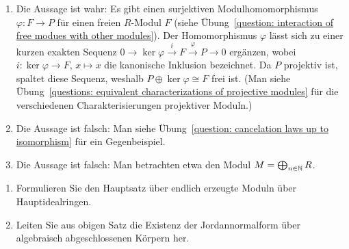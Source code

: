\begin{solution}
\begin{enumerate}
    \item
      Die Aussage ist wahr:
      Es gibt einen surjektiven Modulhomomorphismus $\varphi \colon F \to P$ für einen freien $R$-Modul $F$ (siehe Übung~\ref{question: interaction of free modues with other modules}).
      Der Homomorphismus $\varphi$ lässt sich zu einer kurzen exakten Sequenz $0 \to \ker \varphi \xrightarrow{i} F \xrightarrow{\varphi} P \to 0$ ergänzen, wobei $i \colon \ker \varphi \to F$, $x \mapsto x$ die kanonische Inklusion bezeichnet.
      Da $P$ projektiv ist, spaltet diese Sequenz, weshalb $P \oplus \ker \varphi \cong F$ frei ist.
      (Man siehe Übung~\ref{questions: equivalent characterizations of projective modules} für die verschiedenen Charakterisierungen projektiver Moduln.)
      
    \item
      Die Aussage ist falsch:
      Man siehe Übung~\ref{question: cancelation laws up to isomorphism} für ein Gegenbeispiel.
      
    \item
      Die Aussage ist falsch:
      Man betrachten etwa den Modul $M = \bigoplus_{n \in \mathbb{N}} R$.
  \end{enumerate}
\end{solution}


\begin{question}[subtitle = Herleitung der Jordannormalform]
  \begin{enumerate}
    \item
      Formulieren Sie den Hauptsatz über endlich erzeugte Moduln über Hauptidealringen.
    \item
      Leiten Sie aus obigen Satz die Existenz der Jordannormalform über algebraisch abgeschlossenen Körpern her.
  \end{enumerate}
\end{question}


